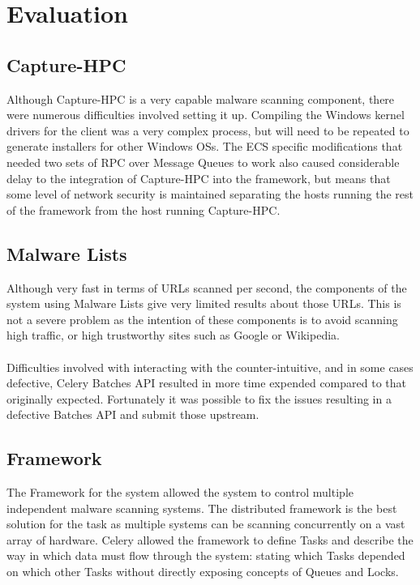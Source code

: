 \section{Evaluation}








\subsection{Capture-HPC}
Although Capture-HPC is a very capable malware scanning component, there were
numerous difficulties involved setting it up. Compiling the Windows kernel
drivers for the client was a very complex process, but will need to be repeated
to generate installers for other Windows OSs. The ECS specific modifications
that needed two sets of RPC over Message Queues to work also caused considerable
delay to the integration of Capture-HPC into the framework, but means that some
level of network security is maintained separating the hosts running the rest of
the framework from the host running Capture-HPC.

\subsection{Malware Lists}
Although very fast in terms of URLs scanned per second, the components of the system using Malware Lists give very limited results about those URLs. This is not a severe problem as the intention of these components is to avoid scanning high traffic, or high trustworthy sites such as Google or Wikipedia.

\paragraph{}
Difficulties involved with interacting with the counter-intuitive, and in some cases defective, Celery Batches API resulted in more time expended compared to that originally expected. Fortunately it was possible to fix the issues resulting in a defective Batches API and submit those upstream.

\subsection{Framework}
The Framework for the system allowed the system to control multiple independent malware scanning systems.  The distributed framework is the best solution for the task as multiple systems can be scanning concurrently on a vast array of hardware. Celery allowed the framework to define Tasks and describe the way in which data must flow through the system: stating which Tasks depended on which other Tasks without directly exposing concepts of Queues and Locks.

